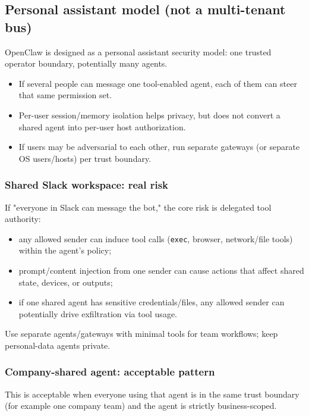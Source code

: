 \subsection{Personal assistant model (not a multi-tenant bus)}


OpenClaw is designed as a personal assistant security model: one trusted operator boundary, potentially many agents.

\begin{itemize}
  \item If several people can message one tool-enabled agent, each of them can steer that same permission set.
  \item Per-user session/memory isolation helps privacy, but does not convert a shared agent into per-user host authorization.
  \item If users may be adversarial to each other, run separate gateways (or separate OS users/hosts) per trust boundary.
\end{itemize}


\subsubsection{Shared Slack workspace: real risk}


If "everyone in Slack can message the bot," the core risk is delegated tool authority:

\begin{itemize}
  \item any allowed sender can induce tool calls (\texttt{exec}, browser, network/file tools) within the agent's policy;
  \item prompt/content injection from one sender can cause actions that affect shared state, devices, or outputs;
  \item if one shared agent has sensitive credentials/files, any allowed sender can potentially drive exfiltration via tool usage.
\end{itemize}


Use separate agents/gateways with minimal tools for team workflows; keep personal-data agents private.

\subsubsection{Company-shared agent: acceptable pattern}


This is acceptable when everyone using that agent is in the same trust boundary (for example one company team) and the agent is strictly business-scoped.

